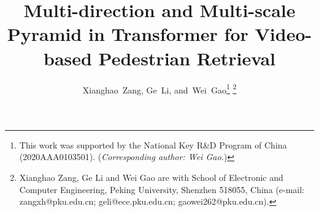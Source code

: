 \documentclass[journal]{IEEEtran}
\begin{document}
\title{Multi-direction and Multi-scale Pyramid in Transformer for Video-based Pedestrian Retrieval}


\author{Xianghao~Zang,
			Ge~Li,
			and~Wei~Gao\thanks{This work was supported by the National Key R\&D Program of China (2020AAA0103501). (\textit{Corresponding author: Wei Gao.})}
			\thanks{Xianghao Zang, Ge Li and Wei Gao are with School of Electronic and Computer Engineering, Peking University, Shenzhen 518055, China (e-mail: zangxh@pku.edu.cn; geli@ece.pku.edu.cn; gaowei262@pku.edu.cn).}}





\end{document}
